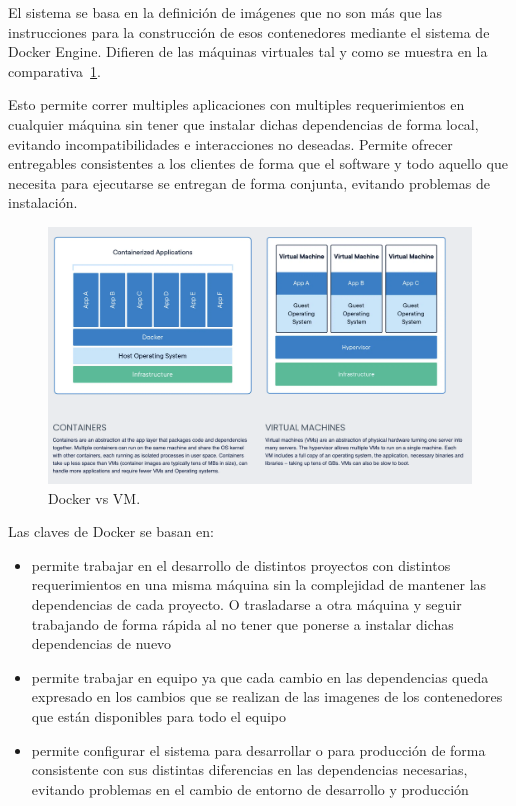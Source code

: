 El sistema se basa en la definición de imágenes que no son más que las instrucciones para la construcción de esos contenedores mediante el sistema de Docker Engine. Difieren de las máquinas virtuales tal y como se muestra en la comparativa~\cref{fig:Docker vs VM}.

Esto permite correr multiples aplicaciones con multiples requerimientos en cualquier máquina sin tener que instalar dichas dependencias de forma local, evitando incompatibilidades e interacciones no deseadas. Permite ofrecer entregables consistentes a los clientes de forma que el software y todo aquello que necesita para ejecutarse se entregan de forma conjunta, evitando problemas de instalación.

\begin{figure}[H]
    \centering
    \includegraphics[height=0.3\textheight]{./part/Proyecto_ejecutivo/memoria_descriptiva/prestaciones/docker/img/dockerVsVM}
    \caption{Docker vs VM.\cite{docker}}\label{fig:Docker vs VM}
\end{figure}

Las claves de Docker se basan en:
\begin{itemize}
    \item permite trabajar en el desarrollo de distintos proyectos con distintos requerimientos en una misma máquina sin la complejidad de mantener las dependencias de cada proyecto. O trasladarse a otra máquina y seguir trabajando de forma rápida al no tener que ponerse a instalar dichas dependencias de nuevo
    \item permite trabajar en equipo ya que cada cambio en las dependencias queda expresado en los cambios que se realizan de las imagenes de los contenedores que están disponibles para todo el equipo
    \item permite configurar el sistema para desarrollar o para producción de forma consistente con sus distintas diferencias en las dependencias necesarias, evitando problemas en el cambio de entorno de desarrollo y producción
\end{itemize}

